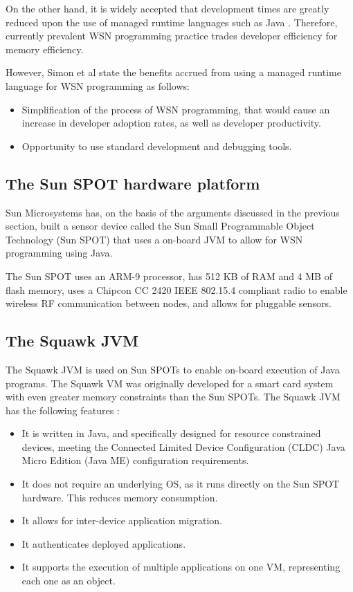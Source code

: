  On the other hand, it is widely accepted that development times are greatly reduced
upon the use of managed runtime languages such as Java
\cite{simon_squawk:2006}. Therefore, currently prevalent WSN programming practice
trades developer efficiency for memory efficiency. 

However, Simon et al \cite{simon_squawk:2006} state the benefits accrued from
using a managed runtime language for WSN programming as follows:

\begin{itemize}
  \item Simplification of the process of WSN programming, that would cause an
  increase in developer adoption rates, as well as developer productivity.
  \item Opportunity to use standard development and debugging tools.
\end{itemize}
 
\subsection{The Sun SPOT hardware platform }
Sun Microsystems has, on the basis of the arguments discussed in the previous
section, built a sensor device
called the Sun Small Programmable Object Technology (Sun SPOT) that uses a
on-board JVM to allow for WSN programming using Java.

The Sun SPOT uses an ARM-9 processor, has 512 KB of RAM and 4 MB of flash
memory, uses a Chipcon CC 2420 IEEE 802.15.4 compliant radio to enable
wireless RF communication between nodes, and allows for pluggable sensors.

\subsection{The Squawk JVM}

The Squawk JVM is used on Sun SPOTs to enable on-board execution of Java
programs. The Squawk VM was originally developed for a smart card system with
even greater memory constraints than the Sun SPOTs. The Squawk JVM has the
following features \cite{simon_squawk:2006}:

\begin{itemize}
  \item It is written in Java, and specifically designed for resource
  constrained devices, meeting the Connected Limited Device Configuration
  (CLDC) Java Micro Edition (Java ME) configuration requirements.
  \item It does not require an underlying OS, as it runs directly on the Sun
  SPOT hardware. This reduces memory consumption.
  \item It allows for inter-device application migration.
  \item It authenticates deployed applications.
  \item It supports the execution of multiple applications on one VM,
  representing each one as an object.
\end{itemize}
  
